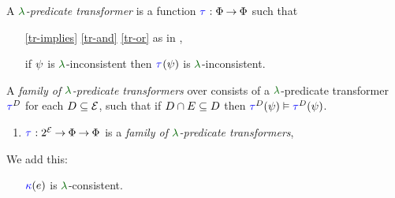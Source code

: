 
\begin{definition}
  \label{def:trans'}
  A \emph{$\labeling$-predicate transformer} is a %
  function
  $\aTr{}{}:\Formulae\fun\Formulae$ such that
  \begin{enumerate}[,label=(\textsc{x}\arabic*),ref=\textsc{x}\arabic*]
  \item[\eqref{tr-implies}]
    \eqref{tr-and}\;
    \eqref{tr-or}\; as in ,
  \item[{\labeltext[\textsc{x}4]{(\textsc{x}4)}{tr-false}}] 
    if $\psi$ is $\labeling$-inconsistent then $\aTr{}{\bForm}$ is $\labeling$-inconsistent.
  \end{enumerate}

  \label{def:family'}
  A \emph{family of $\labeling$-predicate transformers} over consists of a
  $\labeling$-predicate transformer $\aTr{\bEvs}{}$ for each
  $D\subseteq\mathcal{E}$, such that if $D \cap E \subseteq D$
  then $\aTr{\cEvs}{\bForm} \rimplies \aTr{\bEvs}{\bForm}$.

  
  \begin{enumerate}[,label=(\textsc{m}\arabic*),ref=\textsc{m}\arabic*]
  \setcounter{enumi}{\value{Btau}}
  \item \label{pom-tau'}
    $\aTr{}{}:2^{\AllEvents}\fun\Formulae \fun\Formulae$ is a \emph{family of $\labeling$-predicate transformers}, 
  \end{enumerate}
\end{definition}

We add this:
\begin{enumerate}
\item[{\labeltext[\textsc{m}3a]{(\textsc{m}3a)}{pom-kappa-sat}}]
  ${\color{blue}\kappa}(e)$ is $\labeling$-consistent.
\end{enumerate}





\endinput

